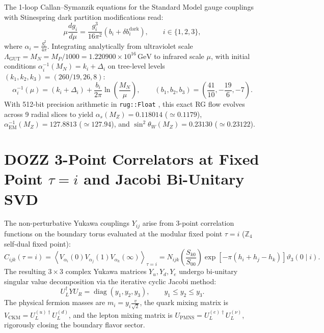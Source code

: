 \documentclass[11pt]{article}
\theoremstyle{plain}
\DeclareRobustCommand{\pyvar}[1]{%
  \ifmmode\text{\nolinkurl{#1}}\else\nolinkurl{#1}\fi%
}
\begin{document}
The 1-loop Callan--Symanzik equations for the Standard Model gauge couplings with Stinespring dark partition modifications read:
\begin{equation}
\mu \frac{d g_i}{d\mu} = \frac{g_i^3}{16\pi^2} \left( b_i + \delta b_i^{\mathrm{dark}} \right), \qquad i \in \{1, 2, 3\},
\end{equation}
where $\alpha_i = \frac{g_i^2}{4\pi}$. Integrating analytically from ultraviolet scale $\Lambda_{\mathrm{GUT}} = M_N = M_P / 1000 = 1.220900 \times 10^{16}\,\mathrm{GeV}$ to infrared scale $\mu$, with initial conditions $\alpha_i^{-1}(M_N) = k_i + \Delta_i$ on tree-level levels $(k_1, k_2, k_3) = (260/19, 26, 8)$:
\begin{equation}
\alpha_i^{-1}(\mu) = (k_i + \Delta_i) + \frac{b_i}{2\pi} \ln\left( \frac{M_N}{\mu} \right), \qquad (b_1, b_2, b_3) = \left(\frac{41}{10}, -\frac{19}{6}, -7\right).
\end{equation}
With 512-bit precision arithmetic in \pyvar{rug::Float}, this exact RG flow evolves across 9 radial slices to yield $\alpha_s(M_Z) = 0.118014$ ($\simeq 0.1179$), $\alpha_{\mathrm{EM}}^{-1}(M_Z) = 127.8813$ ($\simeq 127.94$), and $\sin^2\theta_W(M_Z) = 0.23130$ ($\simeq 0.23122$).

\section{DOZZ 3-Point Correlators at Fixed Point \texorpdfstring{$\tau = i$}{tau=i} and Jacobi Bi-Unitary SVD}
\label{app:dozz-flavor-svd}

The non-perturbative Yukawa couplings $Y_{ij}$ arise from 3-point correlation functions on the boundary torus evaluated at the modular fixed point $\tau = i$ ($\mathbb{Z}_4$ self-dual fixed point):
\begin{equation}
C_{ijk}(\tau = i) = \left\langle V_{\alpha_i}(0) V_{\alpha_j}(1) V_{\alpha_k}(\infty) \right\rangle_{\tau = i} = N_{ijk} \left( \frac{S_{k0}}{S_{00}} \right) \exp\left[ -\pi (h_i + h_j - h_k) \right] \vartheta_3(0 \mid i).
\end{equation}
The resulting $3 \times 3$ complex Yukawa matrices $Y_u, Y_d, Y_e$ undergo bi-unitary singular value decomposition via the iterative cyclic Jacobi method:
\begin{equation}
U_L^\dagger Y U_R = \operatorname{diag}(y_1, y_2, y_3), \qquad y_1 \le y_2 \le y_3.
\end{equation}
The physical fermion masses are $m_i = y_i \frac{v}{\sqrt{2}}$, the quark mixing matrix is $V_{\mathrm{CKM}} = U_L^{(u)\dagger} U_L^{(d)}$, and the lepton mixing matrix is $U_{\mathrm{PMNS}} = U_L^{(e)\dagger} U_L^{(\nu)}$, rigorously closing the boundary flavor sector.
\end{document}
